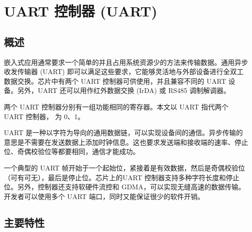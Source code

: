 \documentclass[main\_\_CN.tex]{subfiles}
\begin{document}

\ifglobal
\else
    {\let\clearpage\relax \listoftodos}
    \tableofcontents
\fi


\hypertarget{uart}{}
\chapter{UART 控制器 (UART)}
\label{mod:uart}



\section{概述}

嵌入式应用通常要求一个简单的并且占用系统资源少的方法来传输数据。通用异步收发传输器 (UART) 即可以满足这些要求，它能够灵活地与外部设备进行全双工数据交换。芯片中有两个 UART 控制器可供使用，并且兼容不同的 UART 设备。另外，UART 还可以用作红外数据交换 (IrDA) 或 RS485 调制解调器。

两个 UART 控制器分别有一组功能相同的寄存器。本文以 UART 指代两个 UART 控制器， 为 0、1。

UART 是一种以字符为导向的通用数据链，可以实现设备间的通信。异步传输的意思是不需要在发送数据上添加时钟信息。这也要求发送端和接收端的速率、停止位、奇偶校验位等都要相同，通信才能成功。

一个典型的 UART 帧开始于一个起始位，紧接着是有效数据，然后是奇偶校验位（可有可无），最后是停止位。芯片上的UART 控制器支持多种字符长度和停止位。另外，控制器还支持软硬件流控和 GDMA，可以实现无缝高速的数据传输。开发者可以使用多个 UART 端口，同时又能保证很少的软件开销。

\section{主要特性}
\end{document}
